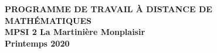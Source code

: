 \documentclass[12pt,a4paper]{article}
\begin{document}
\begin{center}
\Large\bf PROGRAMME DE TRAVAIL À DISTANCE DE MATHÉMATIQUES\\
MPSI 2 La Martinière Monplaisir\\ Printemps 2020
\end{center}
\vspace{1cm}
\vspace{.4cm}

% 
% 
% 
% 
% 
% 
% 
% 
% 
\end{document}
